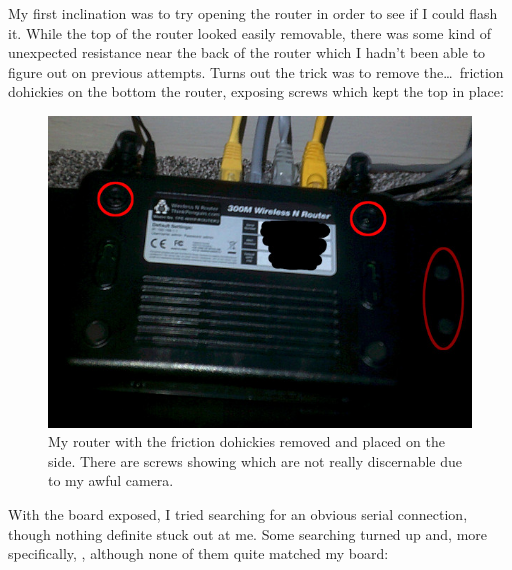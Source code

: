 \documentclass{article}
\begin{document}
My first inclination was to try opening the router in order to see if I could flash it.  While the top of the router looked easily removable, there was some kind of unexpected resistance near the back of the router which I hadn't been able to figure out on previous attempts.  Turns out the trick was to remove the\ldots~friction dohickies on the bottom the router, exposing screws which kept the top in place:

\begin{figure}
\includegraphics{files/blog/2022_04_03_removing_extra_ip_protocols/2022_04_03_router1.jpg}
\caption{My router with the friction dohickies removed and placed on the side.  There are screws showing which are not really discernable due to my awful camera.}
\end{figure}

With the board exposed, I tried searching for an obvious serial connection, though nothing definite stuck out at me.  Some searching turned up  and, more specifically, , although none of them quite matched my board:
\end{document}
